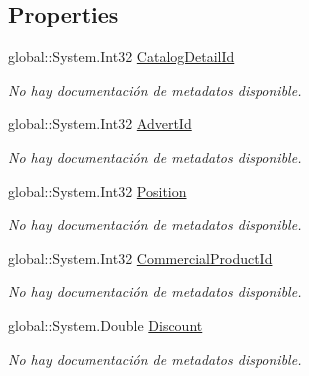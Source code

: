 \subsection*{Properties}
\begin{DoxyCompactItemize}
\item 
global\-::\-System.\-Int32 \hyperlink{class_game_memory_1_1_catalog_details_a29a305600ee6d70b918347bcd40a3c81}{Catalog\-Detail\-Id}
\begin{DoxyCompactList}\small\item\em No hay documentación de metadatos disponible. \end{DoxyCompactList}\item 
global\-::\-System.\-Int32 \hyperlink{class_game_memory_1_1_catalog_details_a32f193effd2e8f0b2704a630aac83568}{Advert\-Id}
\begin{DoxyCompactList}\small\item\em No hay documentación de metadatos disponible. \end{DoxyCompactList}\item 
global\-::\-System.\-Int32 \hyperlink{class_game_memory_1_1_catalog_details_a4b69bad6ac79c610a167f11271a2acf4}{Position}
\begin{DoxyCompactList}\small\item\em No hay documentación de metadatos disponible. \end{DoxyCompactList}\item 
global\-::\-System.\-Int32 \hyperlink{class_game_memory_1_1_catalog_details_a18e97c03d1ac3af15e49bb0059ae3a2a}{Commercial\-Product\-Id}
\begin{DoxyCompactList}\small\item\em No hay documentación de metadatos disponible. \end{DoxyCompactList}\item 
global\-::\-System.\-Double \hyperlink{class_game_memory_1_1_catalog_details_aed76f865302ee9147bffc9fec748bb5f}{Discount}
\begin{DoxyCompactList}\small\item\em No hay documentación de metadatos disponible. \end{DoxyCompactList}\item 

\end{DoxyCompactItemize}
